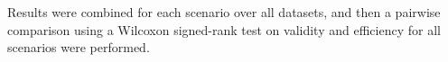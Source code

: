 \documentclass[preprint,12pt,authoryear]{elsarticle}
\begin{document}
%


%


Results were combined for each scenario over all datasets, and then a pairwise comparison using a Wilcoxon signed-rank test on validity and efficiency for all scenarios were performed.





\end{document}
